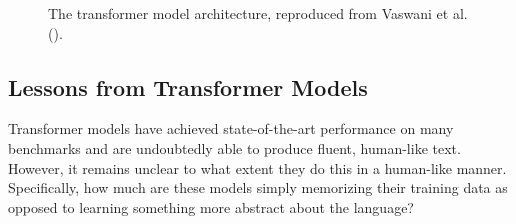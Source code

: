\documentclass[
  12pt,
  letterpaper,
]{scrreprt}
\begin{document}
\begin{figure}[htbp]

\caption{\label{fig-transformermodel}The transformer model architecture,
reproduced from Vaswani et al.
().}


\end{figure}%

\subsection{Lessons from Transformer
Models}\label{lessons-from-transformer-models}

Transformer models have achieved state-of-the-art performance on many
benchmarks and are undoubtedly able to produce fluent, human-like text.
However, it remains unclear to what extent they do this in a human-like
manner. Specifically, how much are these models simply memorizing their
training data as opposed to learning something more abstract about the
language?
\end{document}
